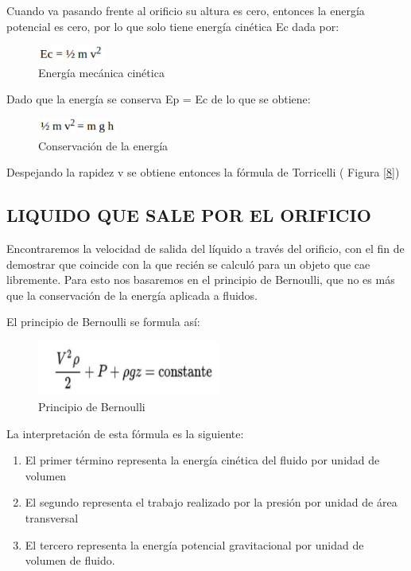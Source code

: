 \documentclass[journal,transmag]{IEEEtran}
\begin{document}
Cuando va pasando frente al orificio su altura es cero, entonces la energía potencial es cero, por lo que solo tiene energía cinética Ec dada por: 
\begin{figure}[!h]
\center
\includegraphics[width=2.2cm]{imagen11.png}
\caption{Energía mecánica cinética}
\label{f7}
\end{figure}


Dado que la energía se conserva Ep = Ec de lo que se obtiene: 
\begin{figure}[!h]
\center
\includegraphics[width=2.6cm]{imagen12.png}
\caption{Conservación de la energía}
\label{f7}
\end{figure}


Despejando la rapidez v se obtiene entonces la fórmula de Torricelli ( Figura \ref{8})

 \subsection{LIQUIDO QUE SALE POR EL ORIFICIO}
 Encontraremos la velocidad de salida del líquido a través del orificio, con el fin de demostrar que coincide con la que recién se calculó para un objeto que cae libremente. Para esto nos basaremos en el principio de Bernoulli, que no es más que la conservación de la energía aplicada a fluidos. 

El principio de Bernoulli se formula así: 

\begin{figure}[!h]
\center
\includegraphics[width=6cm]{imagen13.png}
\caption{Principio de Bernoulli}
\label{12}
\end{figure}
La interpretación de esta fórmula es la siguiente: 
 
 \begin{enumerate}[label=(\roman*)]
	
    \item El primer término representa la energía cinética del fluido por unidad de volumen 
    \item El segundo representa el trabajo realizado por la presión por unidad de área transversal
    \item El tercero representa la energía potencial gravitacional por unidad de volumen de fluido. 
	\end{enumerate}
	
\end{document}
